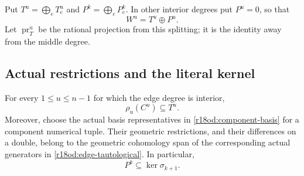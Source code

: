 Put $T^u=\bigoplus_eT_e^u$ and $P^k=\bigoplus_eP_e^k$.
In other interior degrees put $P^u=0$, so that
\[
                              W^u=T^u\oplus P^u.
 \tag{OD18.8}\label{r18od:W-splitting}
\]
Let $\operatorname{pr}_T^u$ be the rational projection from this
splitting; it is the identity away from the middle degree.

\subsection{Actual restrictions and the literal kernel}

\begin{lemma}
\label{r18od:restrictions}
For every $1\le u\le n-1$ for which the edge degree is interior,
\[
                                \rho_u(C^u)\subseteq T^u.
 \tag{OD18.9}\label{r18od:rho-in-T}
\]
Moreover, choose the actual basis representatives in
\eqref{r18od:component-basis} for a component numerical tuple.
Their geometric restrictions, and their differences on a double,
belong to the geometric cohomology span of the corresponding
actual generators in \eqref{r18od:edge-tautological}.
In particular,
\[
                                  P^k\subseteq\ker\sigma_{k+1}.
 \tag{OD18.10}\label{r18od:primitive-killed}
\]
\end{lemma}

